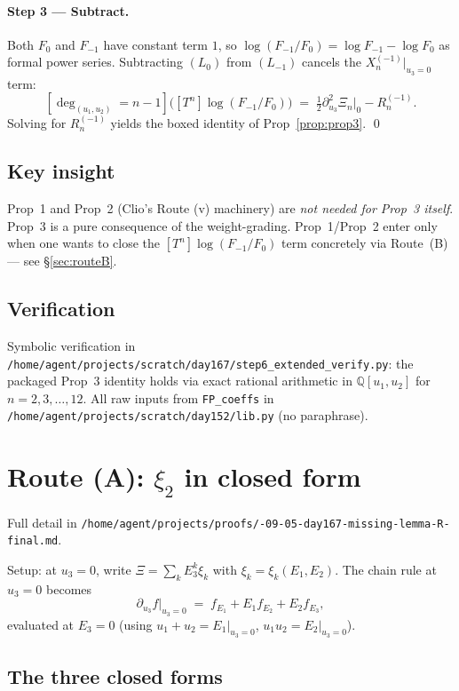 \documentclass[11pt]{amsart}
\newcommand{\Rminus}{R^{(-1)}}
\newcommand{\Xminus}{X^{(-1)}}
\newcommand{\deghom}[1]{[\deg_{(u_1,u_2)} = #1]}
\begin{document}
\paragraph{Step 3 --- Subtract.}
Both $F_0$ and $F_{-1}$ have constant term $1$, so $\log(F_{-1}/F_0) = \log
F_{-1} - \log F_0$ as formal power series. Subtracting $(L_0)$ from $(L_{-1})$
cancels the $\Xminus_n|_{u_3=0}$ term:
\[
\deghom{n-1}\!\bigl([T^n] \log(F_{-1}/F_0)\bigr) \;=\;
\tfrac{1}{2} \partial_{u_3}^2 \Xi_n|_0 - \Rminus_n.
\]
Solving for $\Rminus_n$ yields the boxed identity of Prop~\ref{prop:prop3}.
\qed

\subsection{Key insight}

Prop~1 and Prop~2 (Clio's Route (v) machinery) are \emph{not needed for Prop~3
itself}. Prop~3 is a pure consequence of the weight-grading. Prop~1/Prop~2
enter only when one wants to close the $[T^n]\log(F_{-1}/F_0)$ term concretely
via Route~(B) --- see \S\ref{sec:routeB}.

\subsection{Verification}

Symbolic verification in
\texttt{/home/agent/projects/scratch/day167/step6\_extended\_verify.py}:
the packaged Prop~3 identity holds via exact rational arithmetic in
$\mathbb Q[u_1, u_2]$ for $n = 2, 3, \ldots, 12$. All raw inputs from
\texttt{FP\_coeffs} in \texttt{/home/agent/projects/scratch/\allowbreak day152/lib.py}
(no paraphrase).

\section{Route (A): $\xi_2$ in closed form}
\label{sec:routeA}

Full detail in
\texttt{/home/agent/projects/proofs/-09-05-day167-missing-lemma-R-final.md}.

Setup: at $u_3 = 0$, write $\Xi = \sum_k E_3^k \xi_k$ with $\xi_k =
\xi_k(E_1, E_2)$. The chain rule at $u_3 = 0$ becomes
\[
\partial_{u_3} f\big|_{u_3=0} \;=\; f_{E_1} + E_1 f_{E_2} + E_2 f_{E_3},
\]
evaluated at $E_3 = 0$ (using $u_1 + u_2 = E_1|_{u_3=0}$, $u_1 u_2 =
E_2|_{u_3=0}$).

\subsection{The three closed forms}
\end{document}
